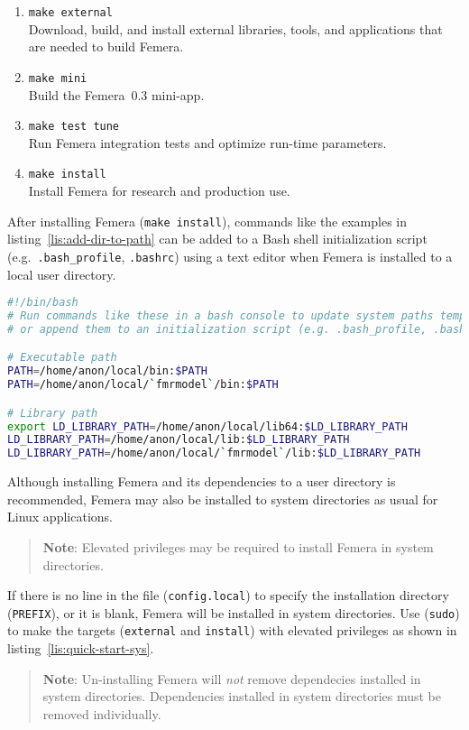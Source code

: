 \begin{enumerate}
\item \texttt{make external}\\
Download, build, and install external libraries, tools, and applications
that are needed to build Femera.

\item \texttt{make mini}\\
Build the Femera~0.3 mini-app.
\item \texttt{make test tune}\\
Run Femera integration tests and optimize run-time parameters.
\item \texttt{make install}\\
Install Femera for research and production use.
\end{enumerate}

After installing Femera (\texttt{make install}),
commands like the examples in listing~\ref{lis:add-dir-to-path}
can be added to a Bash shell initialization script
(e.g.~\texttt{.bash\_profile}, \texttt{.bashrc})
using a text editor when Femera is installed to a local user directory.
\begin{comment}
tdd:tests/pre-build/sys\_bash\_is\_default.py
\end{comment}

\begin{lstlisting}[caption={Add user installation directories to
system search paths.},label={lis:add-dir-to-path},language=bash,float=ht]
#!/bin/bash
# Run commands like these in a bash console to update system paths temporarily,
# or append them to an initialization script (e.g. .bash_profile, .bashrc).

# Executable path
PATH=/home/anon/local/bin:$PATH
PATH=/home/anon/local/`fmrmodel`/bin:$PATH

# Library path
export LD_LIBRARY_PATH=/home/anon/local/lib64:$LD_LIBRARY_PATH
LD_LIBRARY_PATH=/home/anon/local/lib:$LD_LIBRARY_PATH
LD_LIBRARY_PATH=/home/anon/local/`fmrmodel`/lib:$LD_LIBRARY_PATH
\end{lstlisting}

Although installing Femera and its dependencies to a
user directory is recommended, Femera may also be installed to system
directories as usual for Linux applications.
\begin{verse}
\textbf{Note}:
Elevated privileges may be required to install Femera in system directories.
\begin{comment}
tdd:tests/pre-build/sys-user-has-install-privileges.sh
\end{comment}
\end{verse}
If there is no line in the file (\texttt{config.local})
to specify the installation directory (\texttt{PREFIX}), or it is blank,
Femera will be installed in system directories.
Use (\texttt{sudo}) to make the targets (\texttt{external} and
\texttt{install}) with elevated
privileges as shown in listing~\ref{lis:quick-start-sys}.
\begin{verse}
\textbf{Note}:
Un-installing Femera will \textit{not} remove dependecies installed in
system directories.
Dependencies installed in system directories must be removed individually.
\end{verse}

